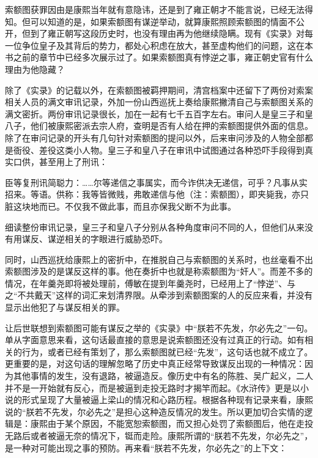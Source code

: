 
索额图获罪因由是康熙当年就有意隐讳，还是到了雍正朝才不能言说，已经无法得知。但可以知道的是，如果索额图有谋逆举动，就算康熙照顾索额图的情面不公开，但到了雍正朝写这段历史时，也没有理由再为他继续隐瞒。现有《实录》对每一位争位皇子及其背后的势力，都处心积虑在放大，甚至虚构他们的问题，这在本书之前的章节中已经多次展示过了。如果索额图真有悖逆之事，雍正朝史官有什么理由为他隐藏？



除了《实录》的记载以外，在索额图被羁押期间，清宫档案中还留下了两份对索案相关人员的满文审讯记录，外加一份山西巡抚上奏给康熙撇清自己与索额图关系的满文密折。两份审讯记录很长，加在一起有七千五百字左右。审问人是皇三子和皇八子，他们被康熙密派去宗人府，查明是否有人给在押的索额图提供外面的信息。除了在审问记录的开头有几句针对索额图的提问以外，后来审问涉及的人物全部都是衙役、差役这类小人物。皇三子和皇八子在审讯中试图通过各种恐吓手段得到真实口供，甚至用上了刑讯：



\begin{bookquote}臣等复刑讯简聪力：……尔等递信之事属实，而今诈供决无递信，可乎？凡事从实招来。等语。供称：我等皆微贱，弗敢递信与他（注：索额图），即夹毙我，亦只脏这块地而已。不仅我不做此事，而且亦保我父断不为此事。\end{bookquote}


细读整份审讯记录，皇三子和皇八子分别从各种角度审问不同的人，但他们从来没有用谋反、谋逆相关的字眼进行威胁恐吓。



同时，山西巡抚给康熙上的密折中，在推脱自己与索额图的关系时，也丝毫看不出索额图涉及的是谋反这样的事。他在奏折中也就是称索额图为“奸人”。而差不多的情况，在年羹尧即将被处理前，傅敏在提到年羹尧时，已经用上了“悖逆”、与之“不共戴天”这样的词汇来划清界限。从牵涉到索额图案的人的反应来看，并没有显示出他犯了与谋反相关的罪。



让后世联想到索额图可能有谋反之举的《实录》中“朕若不先发，尔必先之”一句。单从字面意思来看，这句话最直接的意思是说索额图还没有过真正的行动。如有相关的行为，或者已经有策划了，那么索额图就已经“先发”，这句话也就不成立了。更重要的是，对这句话的理解忽略了历史中真正经常导致谋反出现的一种情况：因为其他事情的发生，没有退路，被逼造反。像历史中有名的陈胜、吴广起义，二人并不是一开始就有反心，而是被逼到走投无路时才揭竿而起。《水浒传》更是以小说的形式呈现了大量被逼上梁山的情况和心路历程。根据各种现有记录来看，康熙说的“朕若不先发，尔必先之”是担心这种造反情况的发生。所以更加切合实情的逻辑是：康熙由于某个原因，不能宽恕索额图，而又担心处罚了索额图后，他在走投无路后或者被逼无奈的情况下，铤而走险。康熙所谓的“朕若不先发，尔必先之”，是一种对可能出现之事的预防。再来看“朕若不先发，尔必先之”的上下文：


